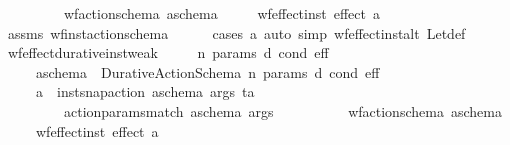 \begin{isabellebody}
\ \ \ \ \ \ \ \ \ {\isachardoublequoteopen}wf{\isacharunderscore}{\kern0pt}action{\isacharunderscore}{\kern0pt}schema\ a\isactrlsub s\isactrlsub c\isactrlsub h\isactrlsub e\isactrlsub m\isactrlsub a{\isachardoublequoteclose}\isanewline
\ \ \ \ \ {\isachardoublequoteopen}wf{\isacharunderscore}{\kern0pt}effect{\isacharunderscore}{\kern0pt}inst\ {\isacharparenleft}{\kern0pt}effect\ a{\isacharparenright}{\kern0pt}{\isachardoublequoteclose}\isanewline
%
\isadelimproof
\ \ \ \ %
\endisadelimproof
%
\isatagproof
{}\isamarkupfalse%
\ assms\ wf{\isacharunderscore}{\kern0pt}inst{\isacharunderscore}{\kern0pt}action{\isacharunderscore}{\kern0pt}schema\isanewline
\ \ \ \ \isamarkupfalse%
\ {\isacharparenleft}{\kern0pt}cases\ a{\isacharparenright}{\kern0pt}\ {\isacharparenleft}{\kern0pt}auto\ simp{\isacharcolon}{\kern0pt}\ wf{\isacharunderscore}{\kern0pt}effect{\isacharunderscore}{\kern0pt}inst{\isacharunderscore}{\kern0pt}alt\ Let{\isacharunderscore}{\kern0pt}def{\isacharparenright}{\kern0pt}%
\endisatagproof
{\isafoldproof}%
%
\isadelimproof
\isanewline
%
\endisadelimproof
\isanewline
\ \ \isamarkupfalse%
\ wf{\isacharunderscore}{\kern0pt}effect{\isacharunderscore}{\kern0pt}durative{\isacharunderscore}{\kern0pt}inst{\isacharunderscore}{\kern0pt}weak{\isacharcolon}{\kern0pt}\isanewline
\ \ \ \ \ n\ params\ d\ cond\ eff\isanewline
\ \ \ \ \ {\isachardoublequoteopen}a\isactrlsub s\isactrlsub c\isactrlsub h\isactrlsub e\isactrlsub m\isactrlsub a\ {\isasymequiv}\ Durative{\isacharunderscore}{\kern0pt}Action{\isacharunderscore}{\kern0pt}Schema\ n\ params\ d\ cond\ eff{\isachardoublequoteclose}\ \ \isanewline
\ \ \ \ \ {\isachardoublequoteopen}a\ {\isacharequal}{\kern0pt}\ inst{\isacharunderscore}{\kern0pt}snap{\isacharunderscore}{\kern0pt}action\ a\isactrlsub s\isactrlsub c\isactrlsub h\isactrlsub e\isactrlsub m\isactrlsub a\ args\ ta{\isachardoublequoteclose}\ \isanewline
\ \ \ \ \ \ \ \ \ {\isachardoublequoteopen}action{\isacharunderscore}{\kern0pt}params{\isacharunderscore}{\kern0pt}match\ a\isactrlsub s\isactrlsub c\isactrlsub h\isactrlsub e\isactrlsub m\isactrlsub a\ args{\isachardoublequoteclose}\ \isanewline
\ \ \ \ \ \ \ \ \ {\isachardoublequoteopen}wf{\isacharunderscore}{\kern0pt}action{\isacharunderscore}{\kern0pt}schema\ a\isactrlsub s\isactrlsub c\isactrlsub h\isactrlsub e\isactrlsub m\isactrlsub a{\isachardoublequoteclose}\isanewline
\ \ \ \ \ {\isachardoublequoteopen}wf{\isacharunderscore}{\kern0pt}effect{\isacharunderscore}{\kern0pt}inst\ {\isacharparenleft}{\kern0pt}effect\ a{\isacharparenright}{\kern0pt}{\isachardoublequoteclose}\isanewline

\end{isabellebody}
